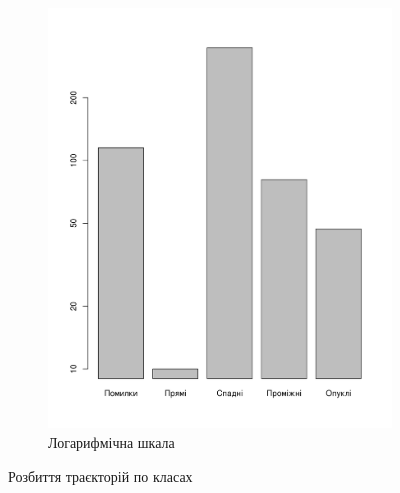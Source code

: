 \begin{figure}[h]
\begin{subfigure}[b]{0.45\textwidth}
    \includegraphics[width=\textwidth]{images/poisson_types_log}
    \caption{Логарифмічна шкала}
    \label{fig:tapping:poisson:types:log}
  \end{subfigure}
  \caption{Розбиття траєкторій по класах}
\end{figure}
